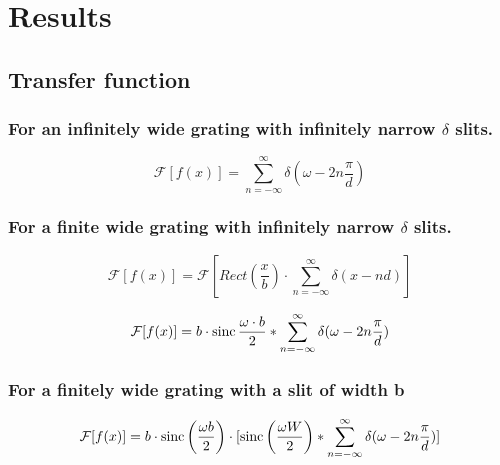 \clearpage
\section{Results}
    \subsection{Transfer function}
        \subsubsection{For an infinitely wide grating with infinitely narrow \texorpdfstring{$\delta$}{Lg} slits.}
            
            \begin{equation}
                \mathcal{F}[f(x)] = \sum_{n=-\infty}^{\infty} \delta(\omega - 2n\frac{\pi}{d})
            \end{equation}

        \subsubsection{For a finite wide grating with infinitely narrow \texorpdfstring{$\delta$}{Lg} slits.}
            
            \begin{equation}
                \mathcal{F}[f(x)] = \mathcal{F}[Rect(\frac{x}{b})\cdot
                \sum_{n=-\infty}^{\infty} \delta(x-nd)]
            \end{equation}
            
            \begin{equation}
                \mathcal{F}[f(x)] = b \cdot \operatorname{sinc}{ \frac{\omega \cdot b}{2}} * \sum_{n=-\infty}^{\infty} \delta(\omega - 2n\frac{\pi}{d}) 
            \end{equation}
            
        \subsubsection{For a finitely wide grating with a slit of width b}
        
            \begin{equation}
                \mathcal{F}[f(x)] = b \cdot \operatorname{sinc}\left(\frac{\omega b}{2}\right)   \cdot [ \operatorname{sinc}\left(\frac{\omega W}{2}\right) * \sum_{n=-\infty}^{\infty} \delta(\omega - 2n\frac{\pi}{d}) ] 
            \end{equation}
            
